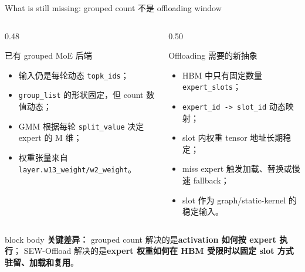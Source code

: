 \documentclass[aspectratio=169,10pt]{beamer}
\begin{document}
\begin{frame}[t]{What is still missing: grouped count 不是 offloading window}
\small
\vspace{-0.45em}

\begin{columns}[T,onlytextwidth]
\begin{column}{0.48\textwidth}
\begin{block}{已有 grouped MoE 后端}
\footnotesize
\begin{itemize}
  \item 输入仍是每轮动态 \texttt{topk\_ids}；
  \item \texttt{group\_list} 的形状固定，但 count 数值动态；
  \item GMM 根据每轮 \texttt{split\_value} 决定 expert 的 M 维；
  \item 权重张量来自 \texttt{layer.w13\_weight/w2\_weight}。
\end{itemize}
\end{block}
\end{column}

\begin{column}{0.50\textwidth}
\begin{block}{Offloading 需要的新抽象}
\footnotesize
\begin{itemize}
  \item HBM 中只有固定数量 \texttt{expert\_slots}；
  \item \texttt{expert\_id -> slot\_id} 动态映射；
  \item slot 内权重 tensor 地址长期稳定；
  \item miss expert 触发加载、替换或慢速 fallback；
  \item slot 作为 graph/static-kernel 的稳定输入。
\end{itemize}
\end{block}
\end{column}
\end{columns}

\vspace{0.85em}
\begin{beamercolorbox}[wd=\linewidth,sep=0.72em,rounded=true]{block body}
\textbf{\textcolor{AccentRed}{关键差异：}}
grouped count 解决的是\textbf{activation 如何按 expert 执行}；
SEW-Offload 解决的是\textbf{expert 权重如何在 HBM 受限时以固定 slot 方式驻留、加载和复用}。
\end{beamercolorbox}
\end{frame}
\end{document}
